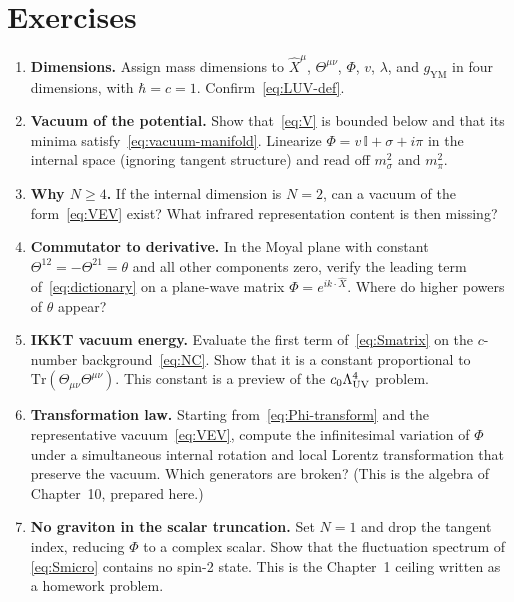 \section{Exercises}
\label{sec:ch3-exercises}

\begin{enumerate}
  \item \textbf{Dimensions.}
    Assign mass dimensions to \(\hat X^\mu\), \(\Theta^{\mu\nu}\),
    \(\Phi\), \(v\), \(\lambda\), and \(g_{\mathrm{YM}}\) in four
    dimensions, with \(\hbar=c=1\). Confirm~\eqref{eq:LUV-def}.
  \item \textbf{Vacuum of the potential.}
    Show that~\eqref{eq:V} is bounded below and that its minima
    satisfy~\eqref{eq:vacuum-manifold}. Linearize
    \(\Phi=v\,\mathbb{I}+\sigma+i\pi\) in the internal space
    (ignoring tangent structure) and read off \(m_\sigma^2\) and
    \(m_\pi^2\).
  \item \textbf{Why \(N\ge 4\).}
    If the internal dimension is \(N=2\), can a vacuum of the
    form~\eqref{eq:VEV} exist? What infrared representation content
    is then missing?
  \item \textbf{Commutator to derivative.}
    In the Moyal plane with constant \(\Theta^{12}=-\Theta^{21}=\theta\)
    and all other components zero, verify the leading term
    of~\eqref{eq:dictionary} on a plane-wave matrix
    \(\Phi=e^{ik\cdot\hat X}\). Where do higher powers of \(\theta\)
    appear?
  \item \textbf{IKKT vacuum energy.}
    Evaluate the first term of~\eqref{eq:Smatrix} on the
    \(c\)-number background~\eqref{eq:NC}. Show that it is a
    constant proportional to \(\mathrm{Tr}(\Theta_{\mu\nu}\Theta^{\mu\nu})\).
    This constant is a preview of the \(c_0\Lambda_{\mathrm{UV}}^4\) problem.
  \item \textbf{Transformation law.}
    Starting from~\eqref{eq:Phi-transform} and the representative
    vacuum~\eqref{eq:VEV}, compute the infinitesimal variation of
    \(\Phi\) under a simultaneous internal rotation and local Lorentz
    transformation that preserve the vacuum. Which generators are
    broken? (This is the algebra of Chapter~10, prepared here.)
  \item \textbf{No graviton in the scalar truncation.}
    Set \(N=1\) and drop the tangent index, reducing \(\Phi\) to a
    complex scalar. Show that the fluctuation spectrum of
    \eqref{eq:Smicro} contains no spin-2 state. This is the
    Chapter~1 ceiling written as a homework problem.
\end{enumerate}

